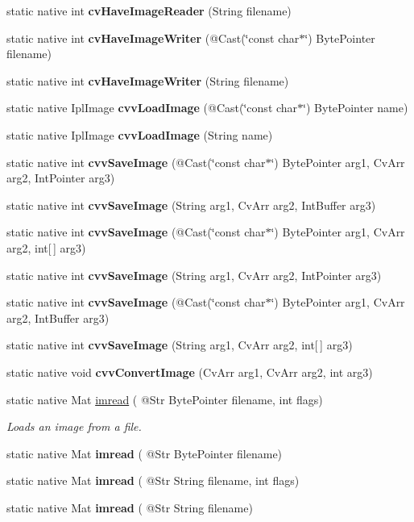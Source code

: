 \begin{DoxyCompactItemize}
\item 
static native int {\bfseries cv\+Have\+Image\+Reader} (String filename)
\item 
static native int {\bfseries cv\+Have\+Image\+Writer} (@Cast(\char`\"{}const char$\ast$\char`\"{}) Byte\+Pointer filename)
\item 
static native int {\bfseries cv\+Have\+Image\+Writer} (String filename)
\item 
static native Ipl\+Image {\bfseries cvv\+Load\+Image} (@Cast(\char`\"{}const char$\ast$\char`\"{}) Byte\+Pointer name)
\item 
static native Ipl\+Image {\bfseries cvv\+Load\+Image} (String name)
\item 
static native int {\bfseries cvv\+Save\+Image} (@Cast(\char`\"{}const char$\ast$\char`\"{}) Byte\+Pointer arg1, Cv\+Arr arg2, Int\+Pointer arg3)
\item 
static native int {\bfseries cvv\+Save\+Image} (String arg1, Cv\+Arr arg2, Int\+Buffer arg3)
\item 
static native int {\bfseries cvv\+Save\+Image} (@Cast(\char`\"{}const char$\ast$\char`\"{}) Byte\+Pointer arg1, Cv\+Arr arg2, int\mbox{[}$\,$\mbox{]} arg3)
\item 
static native int {\bfseries cvv\+Save\+Image} (String arg1, Cv\+Arr arg2, Int\+Pointer arg3)
\item 
static native int {\bfseries cvv\+Save\+Image} (@Cast(\char`\"{}const char$\ast$\char`\"{}) Byte\+Pointer arg1, Cv\+Arr arg2, Int\+Buffer arg3)
\item 
static native int {\bfseries cvv\+Save\+Image} (String arg1, Cv\+Arr arg2, int\mbox{[}$\,$\mbox{]} arg3)
\item 
static native void {\bfseries cvv\+Convert\+Image} (Cv\+Arr arg1, Cv\+Arr arg2, int arg3)
\item 
static native Mat \hyperlink{group__imgcodecs_gab0d3350cc2fd1d26eaae6aeb9df1f14e}{imread} ( @Str Byte\+Pointer filename, int flags)
\begin{DoxyCompactList}\small\item\em Loads an image from a file. \end{DoxyCompactList}\item 
static native Mat {\bfseries imread} ( @Str Byte\+Pointer filename)
\item 
static native Mat {\bfseries imread} ( @Str String filename, int flags)
\item 
static native Mat {\bfseries imread} ( @Str String filename)
\item 

\end{DoxyCompactItemize}
